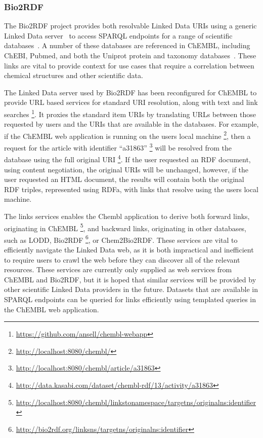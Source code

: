 \documentclass[sw]{iosart2c}
\begin{document}
\subsubsection{Bio2RDF}


The Bio2RDF project provides both resolvable Linked Data URIs using a generic Linked Data
server~\cite{Ansell2011} to access SPARQL endpoints for a range of scientific databases~\cite{Belleau2008}.
A number of these databases are referenced in ChEMBL, including ChEBI, Pubmed, and both the
Uniprot protein and taxonomy databases~\cite{TheUniProtConsortium2010}. These links are
vital to provide context for use cases that require a correlation between chemical
structures and other scientific data. 

The Linked Data server used by Bio2RDF has been reconfigured for ChEMBL to provide URL
based services for standard URI resolution, along with text and link searches
\footnote{\url{https://github.com/ansell/chembl-webapp}}. It proxies the standard item
URIs by translating URLs between those requested by users and the URIs that are available
in the databases. For example, if the ChEMBL web application is running on the users
local machine \footnote{\url{http://localhost:8080/chembl/}}, then a request for the
article with identifier ``a31863'' \footnote{\url{http://localhost:8080/chembl/article/a31863}}
will be resolved from the database using the full original URI
\footnote{\url{http://data.kasabi.com/dataset/chembl-rdf/13/activity/a31863}}. If the
user requested an RDF document, using content negotiation, the original URIs will be unchanged,
however, if the user requested an HTML document, the results will contain both the
original RDF triples, represented using RDFa, with links that resolve using the users local machine.

The links services enables the Chembl application to derive both forward links, originating in
ChEMBL \footnote{\url{http://localhost:8080/chembl/linkstonamespace/targetns/originalns:identifier}},
and backward links, originating in other databases, such as LODD, Bio2RDF
\footnote{\url{http://bio2rdf.org/linksns/targetns/originalns:identifier}}, or Chem2Bio2RDF.
These services are vital to efficiently navigate the Linked Data web, as it is both
impractical and inefficient to require users to crawl the web before they can discover all of the
relevant resources. These services are currently only supplied as web services from ChEMBL and
Bio2RDF, but it is hoped that similar services will be provided by other scientific Linked Data
providers in the future. Datasets that are available in SPARQL endpoints can be queried for
links efficiently using templated queries in the ChEMBL web application.
\end{document}

